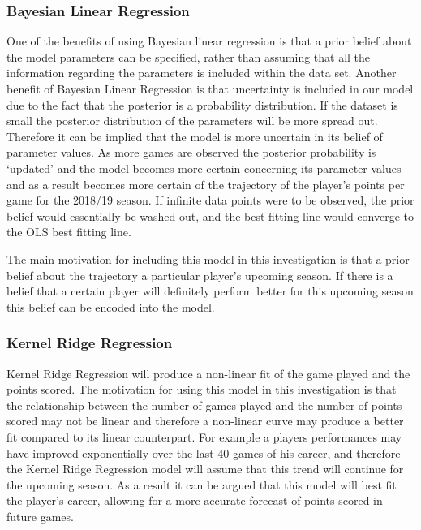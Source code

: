 \documentclass[a4paper,11pt,twoside]{article}
\begin{document}
\subsubsection{Bayesian Linear Regression}
One of the benefits of using Bayesian linear regression is that a prior belief about the model parameters can be specified, rather than assuming that all the information regarding the parameters is included within the data set. Another benefit of Bayesian Linear Regression is that uncertainty is included in our model due to the fact that the posterior is a probability distribution. If the dataset is small the posterior distribution of the parameters will be more spread out. Therefore it can be implied that the model is more uncertain in its belief of parameter values. As more games are observed the posterior probability is `updated' and the model becomes more certain concerning its parameter values and as a result becomes more certain of the trajectory of the player's points per game for the 2018/19 season. If infinite data points were to be observed, the prior belief would essentially be washed out, and the best fitting line would converge to the OLS best fitting line.

The main motivation for including this model in this investigation is that a prior belief about the trajectory a particular player's upcoming season. If there is a belief that a certain player will definitely perform better for this upcoming season this belief can be encoded into the model.

\subsubsection{Kernel Ridge Regression}

Kernel Ridge Regression will produce a non-linear fit of the game played and the points scored. The motivation for using this model in this investigation is that the relationship between the number of games played and the number of points scored may not be linear and therefore a non-linear curve may produce a better fit compared to its linear counterpart. For example a players performances may have improved exponentially over the last 40 games of his career, and therefore the Kernel Ridge Regression model will assume that this trend will continue for the upcoming season. As a result it can be argued that this model will best fit the player's career, allowing for a more accurate forecast of points scored in future games.
\end{document}
